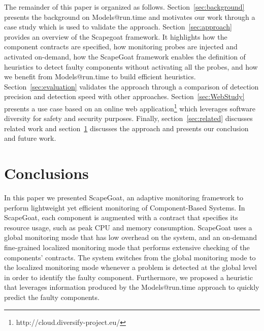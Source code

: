 The remainder of this paper is organized as follows.
Section~\ref{sec:background} presents the background on Models@run.time and motivates our work through a case study which is used to validate the approach.
Section~\ref{sec:approach} provides an overview of the Scapegoat framework.
It highlights how the component contracts are specified, how monitoring probes are injected and activated on-demand, how the ScapeGoat framework enables the definition of heuristics to detect faulty components without activating all the probes, and how we benefit from Models@run.time to build efficient heuristics.
Section~\ref{sec:evaluation} validates the approach through a comparison of detection precision and detection speed with other approaches.
Section~\ref{sec:WebStudy} presents a use case based on an online web application\footnote{http://cloud.diversify-project.eu/} which leverages software diversity for safety and security purposes.
Finally, section~\ref{sec:related} discusses related work and section~\ref{sec:conclusion} discusses the approach and presents our conclusion and future work.






\section{Conclusions}\label{sec:conclusion}
In this paper we presented ScapeGoat, an adaptive monitoring framework to perform lightweight yet efficient monitoring of Component-Based Systems.
In ScapeGoat, each component is augmented with a contract that specifies its resource usage, such as peak CPU and memory consumption.
ScapeGoat uses a global monitoring mode that has low overhead on the system, and an on-demand fine-grained localized monitoring mode that performs extensive checking of the components' contracts.
The system switches from the global monitoring mode to the localized monitoring mode whenever a problem is detected at the global level in order to identify the faulty component.
Furthermore, we proposed a heuristic that leverages information produced by the Models@run.time approach to quickly predict the faulty components. 

